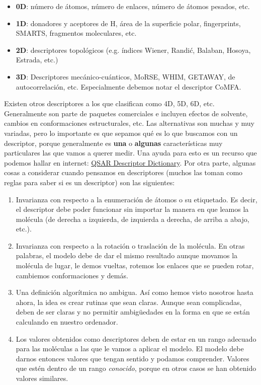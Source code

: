 \documentclass[10pt,letterpaper]{article}
\begin{document}
\begin{itemize}
\item \textbf{0D}: n\'umero de \'atomos, n\'umero de enlaces, n\'umero de \'atomos pesados, etc.
\item \textbf{1D}: donadores y aceptores de H, \'area de la superficie polar, fingerprints, SMARTS, fragmentos moleculares, etc.
\item \textbf{2D}: descriptores topol\'ogicos (e.g. \'indices Wiener, Randi\'c, Balaban, Hosoya, Estrada, etc.)
\item \textbf{3D}: Descriptores mec\'anico-cu\'anticos, MoRSE, WHIM, GETAWAY, de autocorrelaci\'on, etc. Especialmente debemos notar el descriptor CoMFA.
\end{itemize}

Existen otros descriptores a los que clasifican como 4D, 5D, 6D, etc. Generalmente son parte de paquetes comerciales e incluyen efectos de solvente, cambios en conformaciones estructurales, etc. Las alternativas son muchas y muy variadas, pero lo importante es que sepamos qu\'e es lo que buscamos con un descriptor, porque generalmente es \textbf{una} o \textbf{algunas} caracter\'isticas muy particulares las que vamos a querer medir. Una ayuda para esto es un recurso que podemos hallar en internet: \href{http://qsar.sourceforge.net/dicts/qsar-descriptors/index.xhtml}{QSAR Descriptor Dictionary}. Por otra parte, algunas cosas a considerar cuando pensamos en descriptores (muchos las toman como reglas para saber si es un descriptor) son las siguientes:

\begin{enumerate}
\item Invarianza con respecto a la enumeraci\'on de \'atomos o su etiquetado. Es decir, el descriptor debe poder funcionar sin importar la manera en que leamos la mol\'ecula (de derecha a izquierda, de izquierda a derecha, de arriba a abajo, etc.).
\item Invarianza con respecto a la rotaci\'on o traslaci\'on de la mol\'ecula. En otras palabras, el modelo debe de dar el mismo resultado aunque movamos la mol\'ecula de lugar, le demos vueltas, rotemos los enlaces que se pueden rotar, cambiemos conformaciones y dem\'as.
\item Una definici\'on algor\'itmica no ambigua. As\'i como hemos visto nosotros hasta ahora, la idea es crear rutinas que sean claras. Aunque sean complicadas, deben de ser claras y no permitir ambig\"uedades en la forma en que se est\'an calculando en nuestro ordenador.
\item Los valores obtenidos como descriptores deben de estar en un rango adecuado para las mol\'eculas a las que le vamos a aplicar el modelo. El modelo debe darnos entonces valores que tengan sentido y podamos comprender. Valores que est\'en dentro de un rango \emph{conocido}, porque en otros casos se han obtenido valores similares.
\end{enumerate}
\end{document}
